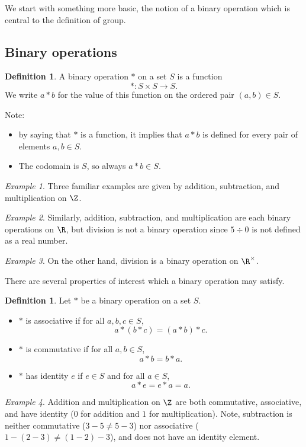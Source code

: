 \documentclass[12pt]{amsart}
\newcommand{\terminology}[1]{\textbf{\textit{#1}}}
\renewcommand{\terminology}[1]{#1}
\newcommand{\term}{\terminology}
\theoremstyle{plain}
\theoremstyle{definition}
\newtheorem{defn}[thm]{Definition}
\theoremstyle{remark}
\newtheorem*{exam}{Example}
\begin{document}
We start with something more basic, the notion of a binary operation
which is central to the definition of group.

\subsection{Binary operations}

\begin{defn}
A \term{binary operation} $*$ on a set $S$ is a function
\[ *:S\times S \to S.\]
We write $a*b$ for the value of this function on the ordered pair
$(a,b)\in S$.
\end{defn}
Note:
\begin{itemize}
\item by saying that $*$ is a function, it implies that $a*b$ is defined
  for every pair of elements $a,b\in S$.
\item The codomain is $S$, so always $a*b\in S$.
\end{itemize}
\begin{exam}
Three familiar examples are given by addition, subtraction, and
multiplication on $\Z$.
\end{exam}

\begin{exam}
Similarly, addition, subtraction,
and multiplication are each binary operations on $\R$, but division is
not a binary operation since $5\div 0$ is not defined as a real number.
\end{exam}

\begin{exam} On the other hand, division is a binary operation on
$\R^\times$.
\end{exam}

There are several properties of interest which a binary operation may
satisfy.
\begin{defn}
  Let $*$ be a binary operation on a set $S$.
\begin{itemize}
\item  $*$ is \term{associative} if for all
  $a,b,c\in S$,
  \[ a*(b*c)=(a*b)*c.\]
\item $*$ is \term{commutative} if for all $a,b\in S$,
  \[ a*b = b*a.\]
\item $*$ has \term{identity} $e$ if $e\in S$ and for all $a\in S$,
  \[ a*e=e*a=a.\]
\end{itemize} 
\end{defn}

\begin{exam}
Addition and multiplication on $\Z$ are both commutative,
associative, and have identity ($0$ for addition and $1$ for
multiplication).  Note, subtraction is neither commutative ($3-5\neq
5-3$) nor associative ($1-(2-3)\neq (1-2)-3$), and does not have an
identity element.
\end{exam}
\end{document}
